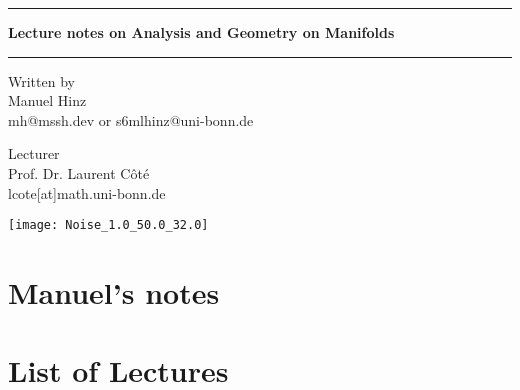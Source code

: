 \documentclass[a4paper, 10pt, oneside]{book}
\author{Manuel Hinz}
\begin{document}
\pagecolor{mycolor}
\begin{titlepage}
    \centering

    \vspace*{1cm}

    {\color{white}\rule{\textwidth}{1pt}}

    \vspace{.7\baselineskip}
    {\huge {\color{white}\textbf{Lecture notes on Analysis and Geometry on Manifolds}}}

    {\color{white}\rule{\textwidth}{1pt}}

    \vspace{1.5cm}

    \large

    \begin{minipage}{.5\textwidth}
        \color{white}
        \centering
        Written by \\
        Manuel Hinz\\
        {\normalsize mh@mssh.dev or s6mlhinz@uni-bonn.de}
    \end{minipage}%
    \begin{minipage}{.5\textwidth}
        \color{white}
        \centering
        Lecturer\\
        Prof. Dr. Laurent Côté  \\
        {\normalsize lcote[at]math.uni-bonn.de}
    \end{minipage}


    \vspace{3cm}

    \texttt{[image: Noise\_1.0\_50.0\_32.0]}

    \vfill

    \color{white}{
    University of Bonn \\
    Winter semester 2024/2025\\
    Last update: \today
    }
   
\end{titlepage}
\pagecolor{white}
\tableofcontents

\restoregeometry
\setcounter{chapter}{-1}
\chapter{Manuel's notes}




\chapter*{List of Lectures}
\begin{itemize}
    \renewcommand*{\do}[1]{\item \hyperlink{#1}{Lecture \StrBehind{#1}{c}:} }
    \dolistloop{\lecturelist}
\end{itemize}
\end{document}
